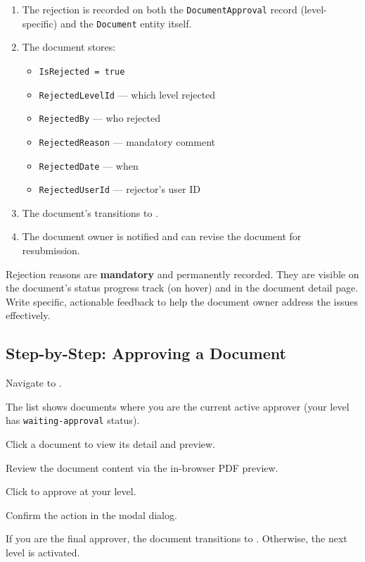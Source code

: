 \begin{enumerate}[leftmargin=18pt]
  \item The rejection is recorded on both the
        \texttt{DocumentApproval} record (level-specific) and
        the \texttt{Document} entity itself.
  \item The document stores:
    \begin{itemize}[leftmargin=14pt]
      \item \texttt{IsRejected = true}
      \item \texttt{RejectedLevelId} --- which level rejected
      \item \texttt{RejectedBy} --- who rejected
      \item \texttt{RejectedReason} --- mandatory comment
      \item \texttt{RejectedDate} --- when
      \item \texttt{RejectedUserId} --- rejector's user ID
    \end{itemize}
  \item The document's  transitions to
        .
  \item The document owner is notified and can revise the
        document for resubmission.
\end{enumerate}

\begin{ugImportant}
  Rejection reasons are \textbf{mandatory} and permanently
  recorded. They are visible on the document's status progress
  track (on hover) and in the document detail page. Write
  specific, actionable feedback to help the document owner
  address the issues effectively.
\end{ugImportant}

\subsection{Step-by-Step: Approving a Document}

\begin{ugSteps}
  \item Navigate to .
  \item The list shows documents where you are the current
        active approver (your level has
        \texttt{waiting-approval} status).
  \item Click a document to view its detail and preview.
  \item Review the document content via the in-browser PDF
        preview.
  \item Click  to approve at your level.
  \item Confirm the action in the modal dialog.
  \item If you are the final approver, the document transitions
        to . Otherwise, the next
        level is activated.
\end{ugSteps}

